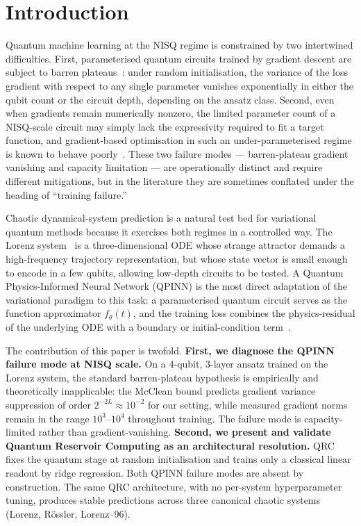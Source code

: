 \documentclass[11pt,a4paper]{article}
\begin{document}
\section{Introduction}

Quantum machine learning at the NISQ regime is constrained by two
intertwined difficulties.
First, parameterised quantum circuits trained by gradient descent are
subject to barren plateaus~\cite{mcclean2018,cerezo2021}: under random
initialisation, the variance of the loss gradient with respect to any
single parameter vanishes exponentially in either the qubit count or
the circuit depth, depending on the ansatz class.
Second, even when gradients remain numerically nonzero, the limited
parameter count of a NISQ-scale circuit may simply lack the
expressivity required to fit a target function, and gradient-based
optimisation in such an under-parameterised regime is known to behave
poorly~\cite{cerezo2021}.
These two failure modes --- barren-plateau gradient vanishing and
capacity limitation --- are operationally distinct and require
different mitigations, but in the literature they are sometimes
conflated under the heading of ``training failure.''

Chaotic dynamical-system prediction is a natural test bed for
variational quantum methods because it exercises both regimes in a
controlled way. The Lorenz system~\cite{lorenz1963} is a
three-dimensional ODE whose strange attractor demands a high-frequency
trajectory representation, but whose state vector is small enough to
encode in a few qubits, allowing low-depth circuits to be tested. A
Quantum Physics-Informed Neural Network (QPINN) is the most direct
adaptation of the variational paradigm to this task: a parameterised
quantum circuit serves as the function approximator $f_\theta(t)$, and
the training loss combines the physics-residual of the underlying ODE
with a boundary or initial-condition term~\cite{qcpinn2024,leung2022qpinn}.

The contribution of this paper is twofold.
\textbf{First, we diagnose the QPINN failure mode at NISQ scale.} On a
$4$-qubit, $3$-layer ansatz trained on the Lorenz system, the standard
barren-plateau hypothesis is empirically and theoretically inapplicable:
the McClean bound predicts gradient variance suppression of order
$2^{-2L} \approx 10^{-2}$ for our setting, while measured gradient
norms remain in the range $10^3$--$10^4$ throughout training. The
failure mode is capacity-limited rather than gradient-vanishing.
\textbf{Second, we present and validate Quantum Reservoir Computing as
an architectural resolution.} QRC fixes the quantum stage at random
initialisation and trains only a classical linear readout by ridge
regression. Both QPINN failure modes are absent by construction. The
same QRC architecture, with no per-system hyperparameter tuning,
produces stable predictions across three canonical chaotic systems
(Lorenz, R\"{o}ssler, Lorenz--96).
\end{document}
